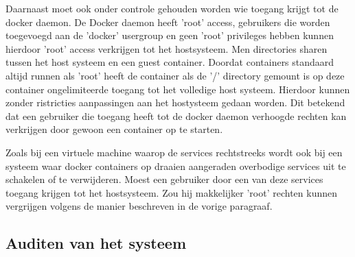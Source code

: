 
Daarnaast moet ook onder controle gehouden worden wie toegang krijgt tot de docker daemon. De Docker daemon heeft 'root' access, gebruikers die worden toegevoegd aan de 'docker' usergroup en geen 'root' privileges hebben kunnen hierdoor 'root' access verkrijgen tot het hostsysteem. Men directories sharen tussen het host systeem en een guest container. Doordat containers standaard altijd runnen als 'root' heeft de container als de '/' directory gemount is op deze container ongelimiteerde toegang tot het volledige host systeem. Hierdoor kunnen zonder ristricties aanpassingen aan het hostysteem gedaan worden. Dit betekend dat een gebruiker die toegang heeft tot de docker daemon verhoogde rechten kan verkrijgen door gewoon een container op te starten.

Zoals bij een virtuele machine waarop de services rechtstreeks wordt ook bij een systeem waar docker containers op draaien aangeraden overbodige services uit te schakelen of te verwijderen. Moest een gebruiker door een van deze services toegang krijgen tot het hostsysteem. Zou hij makkelijker 'root' rechten kunnen vergrijgen volgens de manier beschreven in de vorige paragraaf.

\subsection{Auditen van het systeem}

